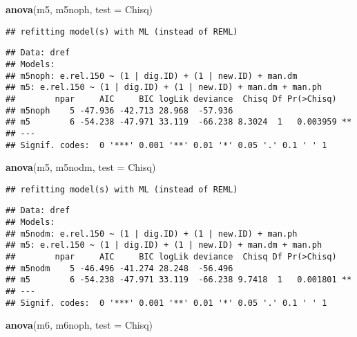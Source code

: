 \documentclass[
]{article}
\newenvironment{Shaded}{\begin{snugshade}}{\end{snugshade}}
\newcommand{\AttributeTok}[1]{\textcolor[rgb]{0.13,0.29,0.53}{#1}}
\newcommand{\FunctionTok}[1]{\textcolor[rgb]{0.13,0.29,0.53}{\textbf{#1}}}
\newcommand{\NormalTok}[1]{#1}
\newcommand{\StringTok}[1]{\textcolor[rgb]{0.31,0.60,0.02}{#1}}
\begin{document}
\begin{Shaded}
\begin{Highlighting}[]
\FunctionTok{anova}\NormalTok{(m5, m5noph, }\AttributeTok{test =} \StringTok{\textquotesingle{}Chisq\textquotesingle{}}\NormalTok{)}
\end{Highlighting}
\end{Shaded}

\begin{verbatim}
## refitting model(s) with ML (instead of REML)
\end{verbatim}

\begin{verbatim}
## Data: dref
## Models:
## m5noph: e.rel.150 ~ (1 | dig.ID) + (1 | new.ID) + man.dm
## m5: e.rel.150 ~ (1 | dig.ID) + (1 | new.ID) + man.dm + man.ph
##        npar     AIC     BIC logLik deviance  Chisq Df Pr(>Chisq)   
## m5noph    5 -47.936 -42.713 28.968  -57.936                        
## m5        6 -54.238 -47.971 33.119  -66.238 8.3024  1   0.003959 **
## ---
## Signif. codes:  0 '***' 0.001 '**' 0.01 '*' 0.05 '.' 0.1 ' ' 1
\end{verbatim}

\begin{Shaded}
\begin{Highlighting}[]
\FunctionTok{anova}\NormalTok{(m5, m5nodm, }\AttributeTok{test =} \StringTok{\textquotesingle{}Chisq\textquotesingle{}}\NormalTok{)}
\end{Highlighting}
\end{Shaded}

\begin{verbatim}
## refitting model(s) with ML (instead of REML)
\end{verbatim}

\begin{verbatim}
## Data: dref
## Models:
## m5nodm: e.rel.150 ~ (1 | dig.ID) + (1 | new.ID) + man.ph
## m5: e.rel.150 ~ (1 | dig.ID) + (1 | new.ID) + man.dm + man.ph
##        npar     AIC     BIC logLik deviance  Chisq Df Pr(>Chisq)   
## m5nodm    5 -46.496 -41.274 28.248  -56.496                        
## m5        6 -54.238 -47.971 33.119  -66.238 9.7418  1   0.001801 **
## ---
## Signif. codes:  0 '***' 0.001 '**' 0.01 '*' 0.05 '.' 0.1 ' ' 1
\end{verbatim}

\begin{Shaded}
\begin{Highlighting}[]
\FunctionTok{anova}\NormalTok{(m6, m6noph, }\AttributeTok{test =} \StringTok{\textquotesingle{}Chisq\textquotesingle{}}\NormalTok{)}
\end{Highlighting}
\end{Shaded}
\end{document}
